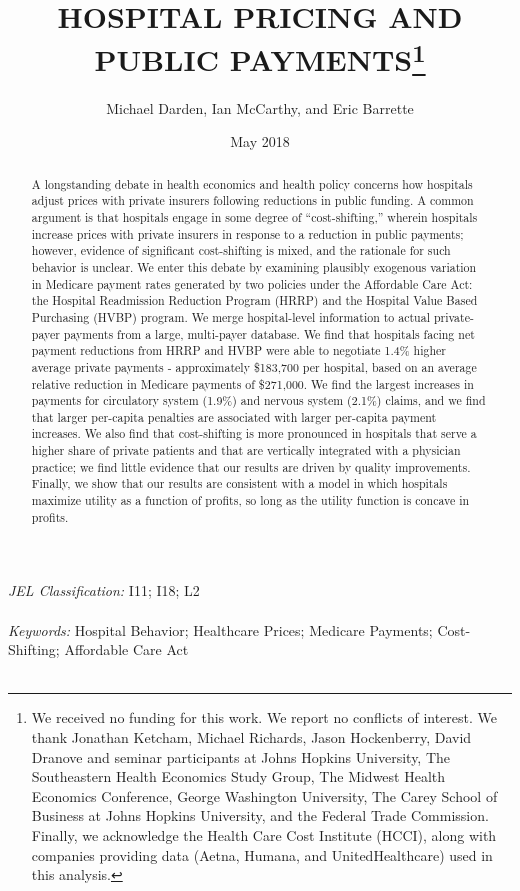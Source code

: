 \documentclass[12pt]{article}
\begin{document}
\title{HOSPITAL PRICING AND PUBLIC PAYMENTS\thanks{We received no funding for this work.  We report no conflicts of interest. We thank Jonathan Ketcham, Michael Richards, Jason Hockenberry, David Dranove and seminar participants at Johns Hopkins University, The Southeastern Health Economics Study Group, The Midwest Health Economics Conference, George Washington University, The Carey School of Business at Johns Hopkins University, and the Federal Trade Commission. Finally, we acknowledge the Health Care Cost Institute (HCCI), along with companies providing data (Aetna, Humana, and UnitedHealthcare) used in this analysis.}}
\author{%
  Michael Darden, Ian McCarthy, and Eric Barrette
}
\date{May 2018}

\maketitle

\begin{abstract}
A longstanding debate in health economics and health policy concerns how hospitals adjust prices with private insurers following reductions in public funding. A common argument is that hospitals engage in some degree of ``cost-shifting,'' wherein hospitals increase prices with private insurers in response to a reduction in public payments; however, evidence of significant cost-shifting is mixed, and the rationale for such behavior is unclear.  We enter this debate by examining plausibly exogenous variation in Medicare payment rates generated by two policies under the Affordable Care Act: the Hospital Readmission Reduction Program (HRRP) and the Hospital Value Based Purchasing (HVBP) program.  We merge hospital-level information to actual private-payer payments from a large, multi-payer database. We find that hospitals facing net payment reductions from HRRP and HVBP were able to negotiate 1.4\% higher average private payments - approximately \$183,700 per hospital, based on an average relative reduction in Medicare payments of \$271,000. We find the largest increases in payments for circulatory system (1.9\%) and nervous system (2.1\%) claims, and we find that larger per-capita penalties are associated with larger per-capita payment increases.  We also find that cost-shifting is more pronounced in hospitals that serve a higher share of private patients and that are vertically integrated with a physician practice; we find little evidence that our results are driven by quality improvements.  Finally, we show that our results are consistent with a model in which hospitals maximize utility as a function of profits, so long as the utility function is concave in profits.
\end{abstract}
\noindent \textit{JEL Classification:} I11; I18; L2 \\\\
\noindent \textit{Keywords:} Hospital Behavior; Healthcare Prices; Medicare Payments; Cost-Shifting; Affordable Care Act\\\\
\end{document}
